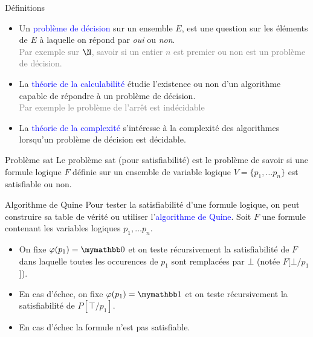 \documentclass[10pt]{beamer}
\begin{document}
\begin{frame}{\Ctitle}{\stitle}
\begin{block}{Définitions}
    \begin{itemize}
		\item<1-> Un \textcolor{blue}{problème de décision} sur un ensemble $E$, est une question sur les éléments de $E$ à laquelle on répond par \textit{oui} ou \textit{non}.\\
		\textcolor{gray}{Par exemple sur $\N$, savoir si un entier $n$ est premier ou non est un problème de décision.}
		\item<2-> La \textcolor{blue}{théorie de la calculabilité} étudie l'existence ou non d'un algorithme capable de répondre à un problème de décision.\\
		\textcolor{gray}{Par exemple le problème de l'arrêt est indécidable}
		\item<3-> La \textcolor{blue}{théorie de la complexité} s'intéresse à la complexité des algorithmes lorsqu'un problème de décision est décidable.		
	\end{itemize}
\end{block}
\end{frame}

\begin{frame}{\Ctitle}{\stitle}
	\begin{alertblock}{Problème {\sc sat}}
		Le problème {\sc sat} (pour satisfiabilité) est le problème de savoir si une formule logique $F$ définie sur un ensemble de variable logique $V = \{p_1, \dots p_n\}$ est satisfiable ou non.
	\end{alertblock}
\end{frame}



\begin{frame}{\Ctitle}{\stitle}
    \begin{alertblock}{Algorithme de Quine}
    Pour tester la satisfiabilité d'une formule logique, on peut construire sa table de vérité ou utiliser l'\textcolor{blue}{algorithme de Quine}. Soit $F$ une formule contenant les variables logiques $p_1, \dots p_n$.
    \begin{itemize}
        \item On fixe $\varphi(p_1) = \faux$ et on teste récursivement la satisfiabilité de $F$ dans laquelle toutes les occurences de $p_1$ sont remplacées par $\bot$ (notée $F[\bot/p_1$]).
        \item En cas d'échec,  on fixe $\varphi(p_1) = \vrai$ et on teste récursivement la satisfiabilité de $P[\top/p_1]$.
        \item En cas d'échec la formule n'est pas satisfiable.
    \end{itemize}
\end{alertblock}
\end{frame}
\end{document}
